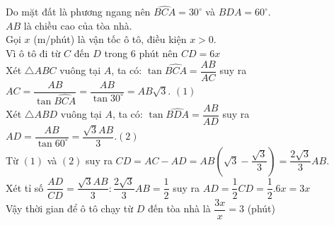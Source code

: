 \begin{ex}
{\begin{center}
	\end{center}
	Do mặt đất là phương ngang nên $\widehat{BCA}=30^\circ$ và $\widehat{BDA}=60^\circ$.\\
	$AB$ là chiều cao của tòa nhà.\\
	Gọi $x$ (m/phút) là vận tốc ô tô, điều kiện $x > 0$.\\
	Vì ô tô đi từ $C$ đến $D$ trong $6$ phút nên $CD=6x$\\
	Xét $\triangle ABC$ vuông tại $A$, ta có: $\tan \widehat{BCA}=\dfrac{AB}{AC}$ suy ra $AC=\dfrac{AB}{\tan \widehat{BCA}}=\dfrac{AB}{\tan{30^\circ}}=AB\sqrt{3}$. $(1)$\\
	Xét $\triangle ABD$ vuông tại $A$, ta có: $\tan \widehat{BDA}=\dfrac{AB}{AD}$ suy ra $AD=\dfrac{AB}{\tan{60^\circ}}=\dfrac{\sqrt{3}AB}{3}.(2)$\\
	Từ $(1)$ và $(2)$ suy ra $CD=AC-AD=AB\left(\sqrt{3}-\dfrac{\sqrt{3}}{3}\right)=\dfrac{2\sqrt{3}}{3}AB$.\\
	Xét tỉ số $\dfrac{AD}{CD}=\dfrac{\sqrt{3}AB}{3}:\dfrac{2\sqrt{3}}{3}AB=\dfrac{1}{2}$ suy ra $AD=\dfrac{1}{2}CD=\dfrac{1}{2}.6x=3x$\\
	Vậy thời gian để ô tô chạy từ $D$ đến tòa nhà là $\dfrac{3x}{x}=3$ (phút)}
\end{ex}
